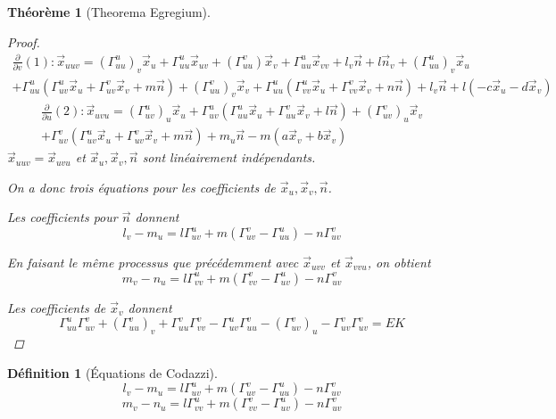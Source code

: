 \documentclass{report}
\newtheorem*{thm}{Th\'eor\`eme}
\theoremstyle{definition}
\newtheorem*{dfn}{D\'efinition}
\theoremstyle{remark}
\begin{document}
\begin{thm}[Theorema Egregium]
\begin{proof}
			\begin{multline*}
				\frac{\partial}{\partial v}(1):\vec x_{uuv} = \left(\Gamma_{uu}^u\right)_v\vec x_u+\Gamma_{uu}^u\vec x_{uv} + \left(\Gamma_{uu}^v\right)\vec x_v+\Gamma_{uu}^u\vec x_{vv} + l_v\vec n+l\vec n_v + \left(\Gamma_{uu}^u\right)_v\vec x_u\\
				+\Gamma_{uu}^u\left(\Gamma_{uv}^u\vec x_u + \Gamma_{uv}^v\vec x_v + m\vec n\right) + \left(\Gamma_{uu}^v\right)_v\vec x_v+\Gamma_{uu}^u\left(\Gamma_{vv}^u\vec x_u + \Gamma_{vv}^v\vec x_v + n\vec n\right) + l_v\vec n+l\left(-c\vec x_u-d\vec x_v\right)
			\end{multline*} %
			\begin{multline*}
				\frac{\partial}{\partial u}(2):\vec x_{uvu} = \left(\Gamma_{uv}^u\right)_u\vec x_u+\Gamma_{uv}^u\left(\Gamma_{uu}^u\vec x_u+\Gamma_{uu}^v\vec x_v+l\vec n\right) + \left(\Gamma_{uv}^v\right)_u\vec x_v\\
				+\Gamma_{uv}^v\left(\Gamma_{uv}^u\vec x_u+\Gamma_{uv}^v\vec x_v+m\vec n\right) + m_u\vec n-m\left(a\vec x_v+b\vec x_v\right)
			\end{multline*}
			$\vec x_{uuv} = \vec x_{uvu}$ et $\vec x_u,\vec x_v,\vec n$ sont lin\'eairement ind\'ependants.

			On a donc trois \'equations pour les coefficients de $\vec x_u,\vec x_v,\vec n$.

			Les coefficients pour $\vec n$ donnent
			\begin{equation*}
				l_v-m_u = l\Gamma_{uv}^u+m\left( \Gamma_{uv}^v-\Gamma_{uu}^u \right)-n\Gamma_{uv}^v
			\end{equation*}

			En faisant le m\^eme processus que pr\'ec\'edemment avec $\vec x_{uvv}$ et $\vec x_{vvu}$, on obtient
			\begin{equation*}
				m_v-n_u = l\Gamma_{vv}^u+m\left( \Gamma_{vv}^v-\Gamma_{uv}^u \right)-n\Gamma_{uv}^v
			\end{equation*}

			Les coefficients de $\vec x_v$ donnent
			\begin{equation*}
				\Gamma_{uu}^u\Gamma_{uv}^v + \left(\Gamma_{uu}^v\right)_v + \Gamma_{uu}^v\Gamma_{vv}^v - \Gamma_{uv}^u\Gamma_{uu}^v - \left(\Gamma_{uv}^v\right)_u - \Gamma_{uv}^v\Gamma_{uv}^v = EK
			\end{equation*}
		\end{proof}
	\end{thm}

	\begin{dfn}[\'Equations de Codazzi]
		\begin{equation*}
			l_v-m_u = l\Gamma_{uv}^u+m\left( \Gamma_{uv}^v-\Gamma_{uu}^u \right)-n\Gamma_{uv}^v
		\end{equation*}
		\begin{equation*}
			m_v-n_u = l\Gamma_{vv}^u+m\left( \Gamma_{vv}^v-\Gamma_{uv}^u \right)-n\Gamma_{uv}^v
		\end{equation*}
	\end{dfn}
\end{document}
